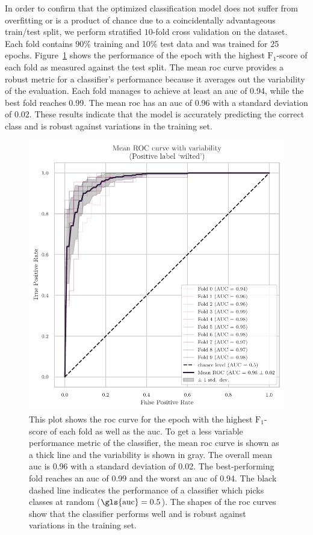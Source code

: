 \documentclass[draft,final]{vutinfth} %
\begin{document}
In order to confirm that the optimized classification model does not
suffer from overfitting or is a product of chance due to a
coincidentally advantageous train/test split, we perform stratified
$10$-fold cross validation on the dataset. Each fold contains 90\%
training and 10\% test data and was trained for \num{25}
epochs. Figure~\ref{fig:classifier-hyp-roc} shows the performance of
the epoch with the highest $\mathrm{F}_1$-score of each fold as
measured against the test split. The mean \gls{roc} curve provides a
robust metric for a classifier's performance because it averages out
the variability of the evaluation. Each fold manages to achieve at
least an \gls{auc} of \num{0.94}, while the best fold reaches
\num{0.99}. The mean \gls{roc} has an \gls{auc} of \num{0.96} with a
standard deviation of \num{0.02}. These results indicate that the
model is accurately predicting the correct class and is robust against
variations in the training set.

\begin{figure}
  \centering
  \includegraphics{graphics/classifier-hyp-folds-roc.pdf}
  \caption[Mean \gls{roc} and variability of hyperparameter-optimized
  model.]{This plot shows the \gls{roc} curve for the epoch with the
    highest $\mathrm{F}_1$-score of each fold as well as the
    \gls{auc}. To get a less variable performance metric of the
    classifier, the mean \gls{roc} curve is shown as a thick line and
    the variability is shown in gray. The overall mean \gls{auc} is
    \num{0.96} with a standard deviation of \num{0.02}. The
    best-performing fold reaches an \gls{auc} of \num{0.99} and the
    worst an \gls{auc} of \num{0.94}. The black dashed line indicates
    the performance of a classifier which picks classes at random
    ($\mathrm{\gls{auc}} = 0.5$). The shapes of the \gls{roc} curves
    show that the classifier performs well and is robust against
    variations in the training set.}
  \label{fig:classifier-hyp-roc}
\end{figure}
\end{document}
